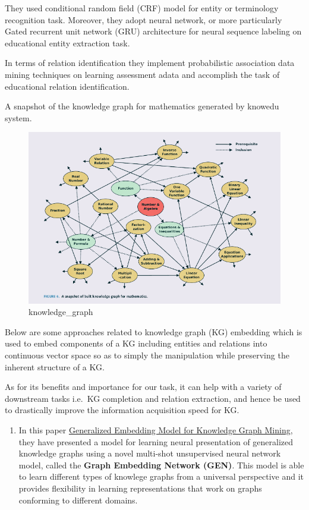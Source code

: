\documentclass[]{book}
\providecommand{\tightlist}{%
  \setlength{\itemsep}{0pt}\setlength{\parskip}{0pt}}
\theoremstyle{definition}
\theoremstyle{definition}
\theoremstyle{definition}
\theoremstyle{remark}
\begin{document}
They used conditional random field (CRF) model for entity or terminology
recognition task. Moreover, they adopt neural network, or more
particularly Gated recurrent unit network (GRU) architecture for neural
sequence labeling on educational entity extraction task.

In terms of relation identification they implement probabilistic
association data mining techniques on learning assessment adata and
accomplish the task of educational relation identification.

A snapshot of the knowledge graph for mathematics generated by knowedu
system.

\begin{figure}
\centering
\includegraphics{img/kg.png}
\caption{knowledge\_graph}
\end{figure}

Below are some approaches related to knowledge graph (KG) embedding
which is used to embed components of a KG including entities and
relations into continuous vector space so as to simply the manipulation
while preserving the inherent structure of a KG.

As for its benefits and importance for our task, it can help with a
variety of downstream tasks i.e.~KG completion and relation extraction,
and hence be used to drastically improve the information acquisition
speed for KG.

\begin{enumerate}
\def\labelenumi{\arabic{enumi}.}
\setcounter{enumi}{1}
\tightlist
\item
  In this paper
  \href{http://www.mlgworkshop.org/2018/papers/MLG2018_paper_5.pdf}{Generalized
  Embedding Model for Knowledge Graph Mining}, they have presented a
  model for learning neural presentation of generalized knowledge graphs
  using a novel multi-shot unsupervised neural network model, called the
  \textbf{Graph Embedding Network (GEN)}. This model is able to learn
  different types of knowlege graphs from a universal perspective and it
  provides flexibility in learning representations that work on graphs
  conforming to different domains.
\end{enumerate}
\end{document}
